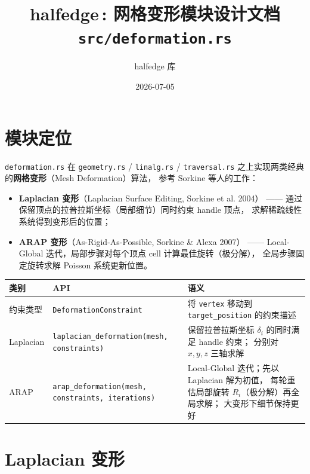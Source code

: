 \documentclass[11pt,a4paper]{article}
\title{\textbf{halfedge\,: 网格变形模块设计文档} \\ \large \texttt{src/deformation.rs}}
\author{halfedge 库}
\date{2026-07-05}
\begin{document}
\maketitle
\tableofcontents

\section{模块定位}

\texttt{deformation.rs} 在 \texttt{geometry.rs} / \texttt{linalg.rs} /
\texttt{traversal.rs} 之上实现两类经典的\textbf{网格变形}（Mesh Deformation）算法，
参考 Sorkine 等人的工作：

\begin{itemize}
  \item \textbf{Laplacian 变形}（Laplacian Surface Editing, Sorkine et al. 2004）
        —— 通过保留顶点的拉普拉斯坐标（局部细节）同时约束 handle 顶点，
        求解稀疏线性系统得到变形后的位置；
  \item \textbf{ARAP 变形}（As-Rigid-As-Possible, Sorkine \& Alexa 2007）
        —— Local-Global 迭代，局部步骤对每个顶点 cell 计算最佳旋转（极分解），
        全局步骤固定旋转求解 Poisson 系统更新位置。
\end{itemize}

\begin{center}
\renewcommand{\arraystretch}{1.18}
\begin{tabular}{@{}p{2.2cm}p{4.8cm}p{7.4cm}@{}}
  \toprule
  \textbf{类别} & \textbf{API} & \textbf{语义} \\
  \midrule
  约束类型
    & \texttt{DeformationConstraint}
    & 将 \texttt{vertex} 移动到 \texttt{target\_position} 的约束描述 \\
  \midrule
  Laplacian
    & \texttt{laplacian\_deformation(mesh, constraints)}
    & 保留拉普拉斯坐标 $\delta_i$ 的同时满足 handle 约束；
      分别对 $x,y,z$ 三轴求解 \\
  \midrule
  ARAP
    & \texttt{arap\_deformation(mesh, constraints, iterations)}
    & Local-Global 迭代；先以 Laplacian 解为初值，
      每轮重估局部旋转 $R_i$（极分解）再全局求解；
      大变形下细节保持更好 \\
  \bottomrule
\end{tabular}
\end{center}

\section{Laplacian 变形}
\end{document}
